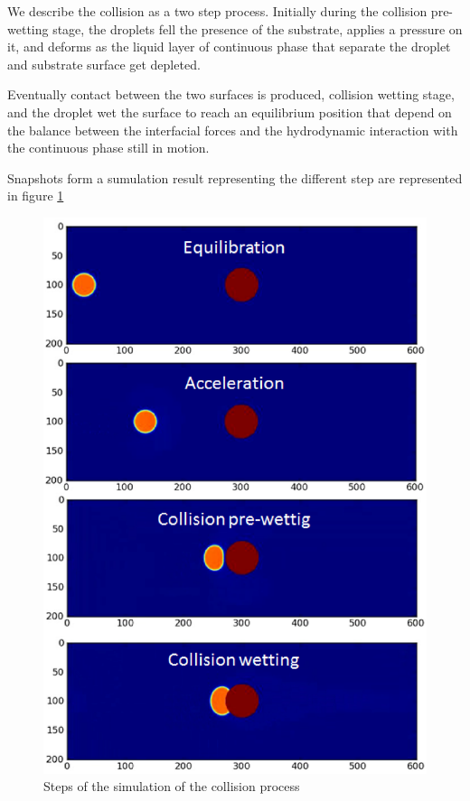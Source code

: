 \documentclass{article}
\begin{document}
We describe the collision as a two step process. Initially during the collision pre-wetting stage, the droplets fell the presence of the substrate, applies a pressure on it, and deforms as the liquid layer of continuous phase that separate the droplet and substrate surface get depleted.

Eventually contact between the two surfaces is produced, collision wetting stage, and the droplet wet the surface to reach an equilibrium position that depend on the balance between the interfacial forces and the hydrodynamic interaction with the continuous phase still in motion.   

Snapshots form a sumulation result representing the different step are represented in figure \ref{fig:simulation:explanation}
 
\begin{figure}[h!]
\includegraphics[width=1\textwidth]{Figures/collision_simulation.eps}
\caption{Steps of the simulation of the collision process\label{fig:simulation:explanation}}
\end{figure} 
\end{document}
